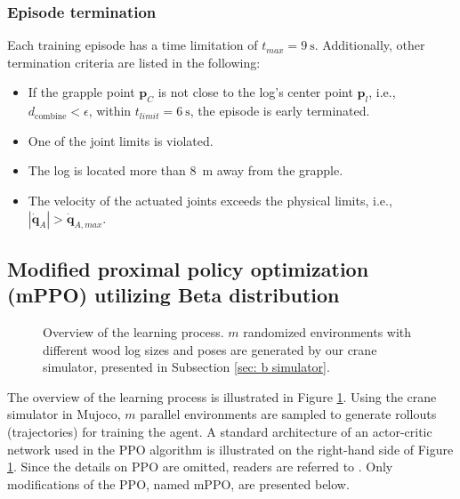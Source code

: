 \subsubsection{Episode termination}
\label{sec: early termination}
Each training episode has a time limitation of $t_{max} = \SI{9}{\second}$. 
Additionally, other termination criteria are listed in the following: 
\begin{itemize}
    \item If the grapple point $\mathbf{p}_C$ is not close to the log's center point $\mathbf{p}_l$,  i.e., $d_\mathrm{combine} < \epsilon$, within $t_{limit} = \SI{6}{\second}$, the episode is early terminated. 
    \item One of the joint limits is violated. 
    \item The log is located more than \SI{8}{\meter} away from the grapple. 
    \item The velocity of the actuated joints exceeds the physical limits, i.e., $|\dot{\mathbf{q}}_A| > \dot{\mathbf{q}}_{A,max}$. 
\end{itemize}
\subsection{Modified proximal policy optimization (mPPO) utilizing Beta distribution}
\label{sec: RPPO}

\begin{figure}[t]
\centering
{}
\vspace{1ex}
\caption{Overview of the learning process. $m$ randomized environments with different wood log sizes and poses are generated by our crane simulator, presented in Subsection \ref{sec: b simulator}. }
\label{fig: overview learning}
\end{figure}
The overview of the learning process is illustrated in Figure \ref{fig: overview learning}. Using the crane simulator in Mujoco, $m$ parallel environments are sampled to generate rollouts (trajectories) for training the agent. A standard architecture of an actor-critic network used in the PPO algorithm is illustrated on the right-hand side of Figure \ref{fig: overview learning}. Since the details on PPO are omitted, readers are referred to \cite{schulman2017proximal}. Only modifications of the PPO, named mPPO, are presented below. 
    
